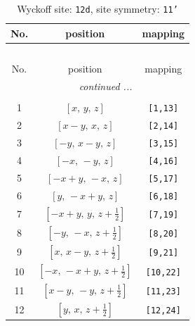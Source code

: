 \documentclass[fleqn,8pt]{jsarticle}
\begin{document}
\begin{longtable}{ccc}
\caption{Wyckoff site: {\tt 12d}, site symmetry: {\tt 11'}}
 \\
 \hline \hline
No. & position & mapping \\ \hline \endfirsthead

\multicolumn{2}{l}{\tablename\ \thetable{}} \\
 \hline \hline
No. & position & mapping \\ \hline \endhead

 \hline \hline
\multicolumn{2}{r}{\footnotesize\it continued ...} \\ \endfoot

 \hline \hline
\multicolumn{2}{r}{} \\ \endlastfoot

1 & $\left[ x,\, y,\, z \right]$ & {\tt [1,13]} \\ \hline
2 & $\left[ x - y,\, x,\, z \right]$ & {\tt [2,14]} \\ \hline
3 & $\left[ - y,\, x - y,\, z \right]$ & {\tt [3,15]} \\ \hline
4 & $\left[ - x,\, - y,\, z \right]$ & {\tt [4,16]} \\ \hline
5 & $\left[ - x + y,\, - x,\, z \right]$ & {\tt [5,17]} \\ \hline
6 & $\left[ y,\, - x + y,\, z \right]$ & {\tt [6,18]} \\ \hline
7 & $\left[ - x + y,\, y,\, z + \frac{1}{2} \right]$ & {\tt [7,19]} \\ \hline
8 & $\left[ - y,\, - x,\, z + \frac{1}{2} \right]$ & {\tt [8,20]} \\ \hline
9 & $\left[ x,\, x - y,\, z + \frac{1}{2} \right]$ & {\tt [9,21]} \\ \hline
10 & $\left[ - x,\, - x + y,\, z + \frac{1}{2} \right]$ & {\tt [10,22]} \\ \hline
11 & $\left[ x - y,\, - y,\, z + \frac{1}{2} \right]$ & {\tt [11,23]} \\ \hline
12 & $\left[ y,\, x,\, z + \frac{1}{2} \right]$ & {\tt [12,24]} \\
\end{longtable}
\end{document}
